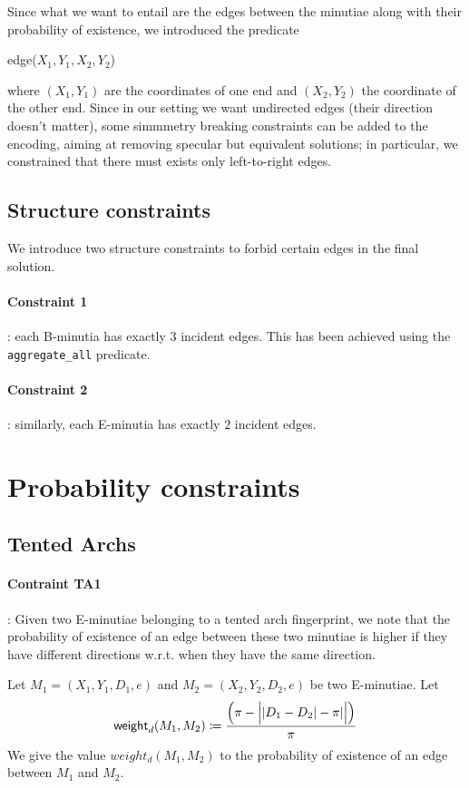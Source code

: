\documentclass[8pt]{article}
\begin{document}
Since what we want to entail are the edges between the minutiae along
with their probability of existence, we introduced the predicate
  \begin{center}
    \textsf{edge($X_1,Y_1,X_2,Y_2$)}
  \end{center}
where $(X_1,Y_1)$ are the coordinates of one end and $(X_2,Y_2)$
the coordinate of the other end.
Since in our setting we want undirected edges (their direction doesn't
matter), some simmmetry breaking constraints can be added to the 
encoding, aiming at removing specular but equivalent solutions; in
particular, we constrained that there must exists only left-to-right
edges.

\subsection{Structure constraints}
We introduce two structure constraints to forbid certain edges
in the final solution.
\paragraph{Constraint 1}:
each B-minutia has exactly $3$ incident edges. This has been achieved
using the \texttt{aggregate\_all} predicate.
\paragraph{Constraint 2}:
similarly, each E-minutia has exactly $2$ incident edges.


\section{Probability constraints}
\subsection{Tented Archs}
\paragraph{Contraint TA1}:
Given two E-minutiae belonging to a tented arch fingerprint, we note that 
the probability of existence of an edge between these two minutiae 
is higher if they have different directions w.r.t. when they have 
the same direction.

Let $M_1=(X_1,Y_1,D_1,e)$ and $M_2=(X_2,Y_2,D_2,e)$ be two E-minutiae.
Let 
  \begin{align*}
    \textsf{weight}_d(M_1,M_2) \coloneqq 
    \frac{
      \left( \pi - \Big\lvert \lvert D_1-D_2 \rvert - 
      \pi \rvert\Big\rvert \right)}{\pi}
  \end{align*} 
We give the value $weight_d(M_1,M_2)$ to the probability of existence of
an edge between $M_1$ and $M_2$.
\end{document}
